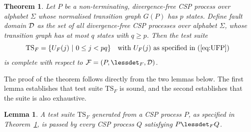 \documentclass[3p,times]{elsarticle}
\newcommand{\TS}{{\text{TS}}}
\newtheorem{lemma}{Lemma}
\newtheorem{theorem}{Theorem}
\begin{document}
\begin{theorem}\label{th:failurestest}
Let $P$ be a non-terminating, divergence-free CSP process over alphabet $\Sigma$ whose
normalised transition graph $G(P)$ has $p$ states. Define fault domain ${\cal
D}$ as the set of all divergence-free CSP processes over alphabet $\Sigma$,
whose transition graph has at most $q$ states with $q \ge p$. Then the test
suite
\[
\TS_F = \{ U_F(j)~|~0 \le j < pq  \}\quad\text{with $U_F(j)$ as specified in (\ref{eq:UFP})}
\]
is complete with respect to ${\cal F} = (P,\lessdet_F,{\cal D})$.
\end{theorem}
%
The proof of the theorem follows directly from the two lemmas below. The
first lemma establishes that test suite $\TS_F$ is sound, and the second
establishes that the suite is also exhaustive.
%
\begin{lemma}\label{lemma:mainfsound}
A test suite $\TS_F$ generated from a CSP process $P$, as specified in
Theorem~\ref{th:failurestest}, is passed by every CSP process $Q$ satisfying
$P\lessdet_F Q$.
\end{lemma}
\end{document}
